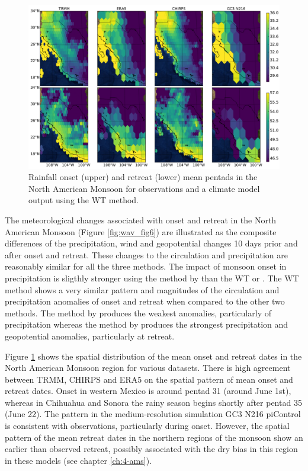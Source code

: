 \begin{figure}[t!]
\centering
 \includegraphics[width=\linewidth]{figures/map_nam_wav.pdf}
\caption[Onset and retreat spatial distribution in North American Monsoon]{ Rainfall onset (upper) and retreat (lower) mean pentads in the North American Monsoon for observations and a climate model output using the WT method.  }
\label{fig:nam_map}
\end{figure}

The meteorological changes associated with onset and retreat in the North American Monsoon  (Figure \ref{fig:wav_fig6}) are illustrated as the composite differences of the precipitation, wind and geopotential changes 10 days prior and after onset and retreat. These changes to the circulation and precipitation are reasonably similar for all the three methods. The impact of monsoon onset in precipitation is sligthly stronger using the method by  than the WT or . 
The WT method shows a very similar pattern and magnitudes of the circulation and precipitation anomalies of onset and retreat when compared to the other two methods. The method by  produces the weakest anomalies, particularly of precipitation whereas the method by  produces the strongest precipitation and geopotential anomalies, particularly at retreat.

Figure \ref{fig:nam_map} shows the spatial distribution of the mean onset and retreat dates in the North American Monsoon region for various datasets.
There is high agreement between TRMM, CHIRPS and ERA5 on the spatial pattern of mean onset and retreat dates.
Onset in western Mexico is around pentad 31 (around June 1st), whereas in Chihuahua and Sonora the rainy season begins shortly after pentad 35 (June 22).
The pattern in the medium-resolution simulation GC3 N216 piControl is consistent with observations, particularly during onset.  However, the spatial pattern of the mean retreat dates in the northern regions of the monsoon show an earlier than observed retreat, possibly associated with the dry bias in this region in these models (see chapter \ref{ch:4-ams}).

